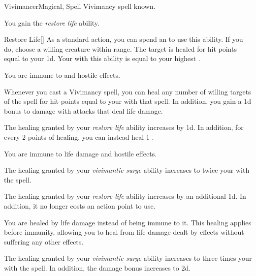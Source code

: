     \begin{feat}{Vivimancer}{Magical, Spell}
        \featpre Vivimancy spell known.

         You gain the \textit{restore life} ability.
        \begin{ability}{Restore Life}[]
            As a standard action, you can spend an  to use this ability.
            If you do, choose a willing creature within \rngmed range.
            The target is healed for hit points equal to your  \plus1d.
            Your  with this ability is equal to your highest .
        \end{ability}

         You are immune to  and hostile  effects.

         Whenever you cast a Vivimancy spell, you can heal any number of willing targets of the spell for hit points equal to your  with that spell.
        In addition, you gain a \plus1d bonus to damage with attacks that deal life damage.

         The healing granted by your \textit{restore life} ability increases by \plus1d.
        In addition, for every 2 points of healing, you can instead heal 1 .

         You are immune to life damage and hostile  effects.

         The healing granted by your \textit{vivimantic surge} ability increases to twice your  with the spell.

         The healing granted by your \textit{restore life} ability increases by an additional \plus1d.
        In addition, it no longer costs an action point to use.

         You are healed by life damage instead of being immune to it.
        This healing applies before immunity, allowing you to heal from life damage dealt by  effects without suffering any other effects.

         The healing granted by your \textit{vivimantic surge} ability increases to three times your  with the spell.
        In addition, the damage bonus increases to \plus2d.

        \ff[19]{} 
    \end{feat}

